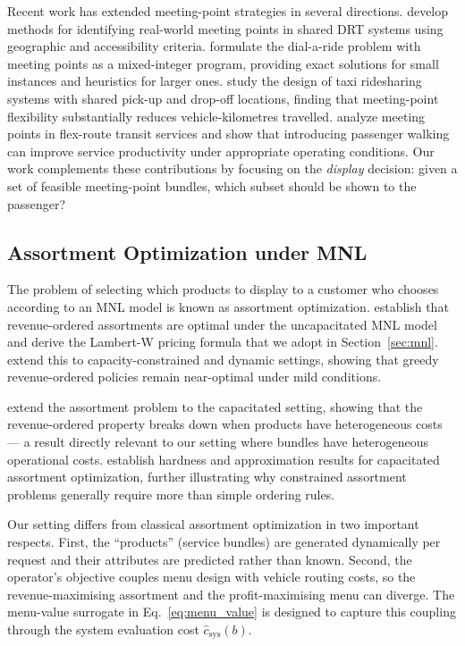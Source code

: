 Recent work has extended meeting-point strategies in several directions. \citet{czioska2019} develop methods for identifying real-world meeting points in shared DRT systems using geographic and accessibility criteria. \citet{cortenbach2024} formulate the dial-a-ride problem with meeting points as a mixed-integer program, providing exact solutions for small instances and heuristics for larger ones. \citet{stumpe2024} study the design of taxi ridesharing systems with shared pick-up and drop-off locations, finding that meeting-point flexibility substantially reduces vehicle-kilometres travelled. \citet{zheng2019meeting} analyze meeting points in flex-route transit services and show that introducing passenger walking can improve service productivity under appropriate operating conditions. Our work complements these contributions by focusing on the \emph{display} decision: given a set of feasible meeting-point bundles, which subset should be shown to the passenger?

\subsection{Assortment Optimization under MNL}

The problem of selecting which products to display to a customer who chooses according to an MNL model is known as assortment optimization. \citet{talluri2004revenue} establish that revenue-ordered assortments are optimal under the uncapacitated MNL model and derive the Lambert-W pricing formula that we adopt in Section~\ref{sec:mnl}. \citet{rusmevichientong2010dynamic} extend this to capacity-constrained and dynamic settings, showing that greedy revenue-ordered policies remain near-optimal under mild conditions.

\citet{wang2012} extend the assortment problem to the capacitated setting, showing that the revenue-ordered property breaks down when products have heterogeneous costs --- a result directly relevant to our setting where bundles have heterogeneous operational costs. \citet{desir2022capacitated} establish hardness and approximation results for capacitated assortment optimization, further illustrating why constrained assortment problems generally require more than simple ordering rules.

Our setting differs from classical assortment optimization in two important respects. First, the ``products'' (service bundles) are generated dynamically per request and their attributes are predicted rather than known. Second, the operator's objective couples menu design with vehicle routing costs, so the revenue-maximising assortment and the profit-maximising menu can diverge. The menu-value surrogate in Eq.~\eqref{eq:menu_value} is designed to capture this coupling through the system evaluation cost $\hat{c}_{\text{sys}}(b)$.

